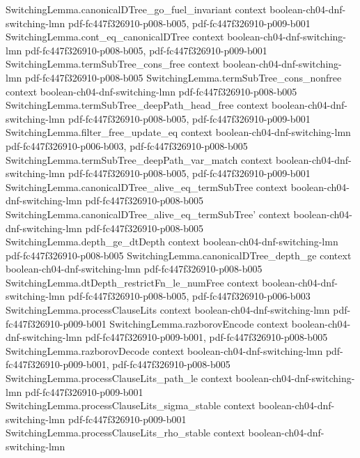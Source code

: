 \begin{theorem}
  {SwitchingLemma.canonicalDTree_go_fuel_invariant}
  {context}
  {boolean-ch04-dnf-switching-lmn}
  {pdf-fc447f326910-p008-b005,
    pdf-fc447f326910-p009-b001}
\proofstep
  {SwitchingLemma.cont_eq_canonicalDTree}
  {context}
  {boolean-ch04-dnf-switching-lmn}
  {pdf-fc447f326910-p008-b005,
    pdf-fc447f326910-p009-b001}
\proofstep
  {SwitchingLemma.termSubTree_cons_free}
  {context}
  {boolean-ch04-dnf-switching-lmn}
  {pdf-fc447f326910-p008-b005}
\proofstep
  {SwitchingLemma.termSubTree_cons_nonfree}
  {context}
  {boolean-ch04-dnf-switching-lmn}
  {pdf-fc447f326910-p008-b005}
\proofstep
  {SwitchingLemma.termSubTree_deepPath_head_free}
  {context}
  {boolean-ch04-dnf-switching-lmn}
  {pdf-fc447f326910-p008-b005,
    pdf-fc447f326910-p009-b001}
\proofstep
  {SwitchingLemma.filter_free_update_eq}
  {context}
  {boolean-ch04-dnf-switching-lmn}
  {pdf-fc447f326910-p006-b003,
    pdf-fc447f326910-p008-b005}
\proofstep
  {SwitchingLemma.termSubTree_deepPath_var_match}
  {context}
  {boolean-ch04-dnf-switching-lmn}
  {pdf-fc447f326910-p008-b005,
    pdf-fc447f326910-p009-b001}
\proofstep
  {SwitchingLemma.canonicalDTree_alive_eq_termSubTree}
  {context}
  {boolean-ch04-dnf-switching-lmn}
  {pdf-fc447f326910-p008-b005}
\proofstep
  {SwitchingLemma.canonicalDTree_alive_eq_termSubTree'}
  {context}
  {boolean-ch04-dnf-switching-lmn}
  {pdf-fc447f326910-p008-b005}
\proofstep
  {SwitchingLemma.depth_ge_dtDepth}
  {context}
  {boolean-ch04-dnf-switching-lmn}
  {pdf-fc447f326910-p008-b005}
\proofstep
  {SwitchingLemma.canonicalDTree_depth_ge}
  {context}
  {boolean-ch04-dnf-switching-lmn}
  {pdf-fc447f326910-p008-b005}
\proofstep
  {SwitchingLemma.dtDepth_restrictFn_le_numFree}
  {context}
  {boolean-ch04-dnf-switching-lmn}
  {pdf-fc447f326910-p008-b005,
    pdf-fc447f326910-p006-b003}
\proofstep
  {SwitchingLemma.processClauseLits}
  {context}
  {boolean-ch04-dnf-switching-lmn}
  {pdf-fc447f326910-p009-b001}
\proofstep
  {SwitchingLemma.razborovEncode}
  {context}
  {boolean-ch04-dnf-switching-lmn}
  {pdf-fc447f326910-p009-b001,
    pdf-fc447f326910-p008-b005}
\proofstep
  {SwitchingLemma.razborovDecode}
  {context}
  {boolean-ch04-dnf-switching-lmn}
  {pdf-fc447f326910-p009-b001,
    pdf-fc447f326910-p008-b005}
\proofstep
  {SwitchingLemma.processClauseLits_path_le}
  {context}
  {boolean-ch04-dnf-switching-lmn}
  {pdf-fc447f326910-p009-b001}
\proofstep
  {SwitchingLemma.processClauseLits_sigma_stable}
  {context}
  {boolean-ch04-dnf-switching-lmn}
  {pdf-fc447f326910-p009-b001}
\proofstep
  {SwitchingLemma.processClauseLits_rho_stable}
  {context}
  {boolean-ch04-dnf-switching-lmn}

\end{theorem}
